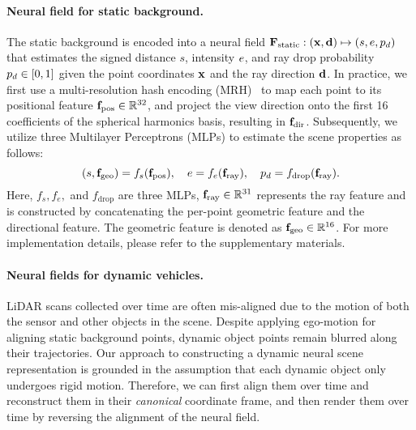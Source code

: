 \paragraph{Neural field for static background.} 
The static background is encoded into a neural field $\mathbf{F}_\text{static}: (\mathbf{x}, \mathbf{d}) \mapsto (s, e, p_d)$ that estimates the signed distance $s$, intensity $e$, and ray drop probability $p_d \in [0,1]$ given the point coordinates $\mathbf{x}$ and the ray direction $\mathbf{d}$. In practice, we first use a multi-resolution hash encoding (MRH)~\cite{mueller2022instant} to map each point to its positional feature $\mathbf{f}_{\text{pos}} \in \mathbb{R}^{32}$, and project the view direction onto the first 16 coefficients of the spherical harmonics basis, resulting in $\mathbf{f}_{\text{dir}}$. Subsequently, we utilize three Multilayer Perceptrons (MLPs) to estimate the scene properties as follows:
\begin{equation}
(s, \mathbf{f}_{\text{geo}}) = f_s(\mathbf{f}_{\text{pos}}), \quad e = f_{e}(\mathbf{f}_{\text{ray}}), \quad p_d = f_{\text{drop}}(\mathbf{f}_{\text{ray}}).
\end{equation}
Here, $f_s, f_e,$ and $f_{\text{drop}}$ are three MLPs, $\mathbf{f}_{\text{ray}} \in \mathbb{R}^{31}$ represents the ray feature and is constructed by concatenating the per-point geometric feature and the directional feature. The geometric feature is denoted as $\mathbf{f}_{\text{geo}} \in \mathbb{R}^{16}$. For more implementation details, please refer to the supplementary materials. 




\paragraph{Neural fields for dynamic vehicles.} 
LiDAR scans collected over time are often mis-aligned due to the motion of both the sensor and other objects in the scene. Despite applying ego-motion for aligning static background points, dynamic object points remain blurred along their trajectories. Our approach to constructing a dynamic neural scene representation is grounded in the assumption that each dynamic object only undergoes rigid motion. Therefore, we can first align them over time and reconstruct them in their \textit{canonical} coordinate frame, and then render them over time by reversing the alignment of the neural field.

